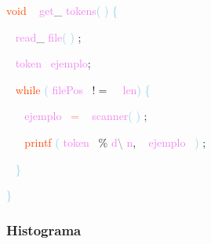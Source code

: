 \documentclass[8, usernames, dvipsnames]{beamer}
\begin{document}
\begin{frame}
\textcolor{OrangeRed}{void}
\textcolor{White}{\ }
\textcolor{Violet}{get}\textcolor{Sepia}{\_}
\textcolor{Violet}{tokens}\textcolor{SkyBlue}{(}
\textcolor{SkyBlue}{)}
\textcolor{SkyBlue}{\{ }

 \textcolor{White}{\   }
\textcolor{Violet}{read}\textcolor{Sepia}{\_}
\textcolor{Violet}{file}\textcolor{SkyBlue}{(}
\textcolor{SkyBlue}{)}
\textcolor{Sepia}{;}

 \textcolor{White}{\   }
\textcolor{Violet}{token}\textcolor{White}{\ }
\textcolor{Violet}{ejemplo}\textcolor{Sepia}{;}

 \textcolor{White}{\   }
\textcolor{OrangeRed}{while}
\textcolor{SkyBlue}{(}
\textcolor{Violet}{filePos}\textcolor{White}{\ }
\textcolor{OliveGreen}{$!=$}
\textcolor{White}{\ }
\textcolor{Violet}{len}\textcolor{SkyBlue}{)}
\textcolor{SkyBlue}{\{ }

 \textcolor{White}{\   }
\textcolor{White}{\   }
\textcolor{Violet}{ejemplo}\textcolor{White}{\ }
\textcolor{Salmon}{=}
\textcolor{White}{\ }
\textcolor{Violet}{scanner}\textcolor{SkyBlue}{(}
\textcolor{SkyBlue}{)}
\textcolor{Sepia}{;}

 \textcolor{White}{\   }
\textcolor{White}{\   }
\textcolor{OrangeRed}{printf}
\textcolor{SkyBlue}{(}
\textcolor{Violet}{token}\textcolor{White}{\ }
\textcolor{Apricot}{\%}
\textcolor{Violet}{d}\textcolor{Gray}{\textbackslash }
\textcolor{Violet}{n}\textcolor{Sepia}{,}
\textcolor{White}{\ }
\textcolor{Violet}{ejemplo}\textcolor{White}{\ }
\textcolor{SkyBlue}{)}
\textcolor{Sepia}{;}

 \textcolor{White}{\   }
\textcolor{SkyBlue}{\} }

 
 \textcolor{SkyBlue}{\} }

 \end{frame}
\begin{frame} 
\frametitle{Histograma} 
\end{frame} 
\end{document}
